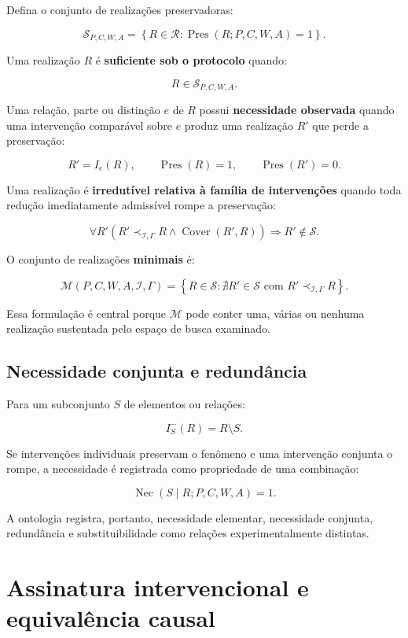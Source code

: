\documentclass[11pt,a4paper]{article}
\begin{document}
Defina o conjunto de realizações preservadoras:

\[
\mathcal S_{P,C,W,A}
=
\left\{
R\in\mathcal R:
\operatorname{Pres}(R;P,C,W,A)=1
\right\}.
\]

Uma realização $R$ é \textbf{suficiente sob o protocolo} quando:

\[
R\in\mathcal S_{P,C,W,A}.
\]

Uma relação, parte ou distinção $e$ de $R$ possui \textbf{necessidade observada}
quando uma intervenção comparável sobre $e$ produz uma realização $R'$ que perde a
preservação:

\[
R' = I_e(R),
\qquad
\operatorname{Pres}(R)=1,
\qquad
\operatorname{Pres}(R')=0.
\]

Uma realização é \textbf{irredutível relativa à família de intervenções} quando toda
redução imediatamente admissível rompe a preservação:

\[
\forall R'
\left(
R'\prec_{\mathcal I,\Gamma}R
\land
\operatorname{Cover}(R',R)
\right)
\Rightarrow
R'\notin\mathcal S.
\]

O conjunto de realizações \textbf{minimais} é:

\[
\boxed{
\mathcal M(P,C,W,A,\mathcal I,\Gamma)
=
\left\{
R\in\mathcal S:
\nexists R'\in\mathcal S
\text{ com }
R'\prec_{\mathcal I,\Gamma}R
\right\}.
}
\]

Essa formulação é central porque $\mathcal M$ pode conter uma, várias ou nenhuma
realização sustentada pelo espaço de busca examinado.

\subsection{Necessidade conjunta e redundância}

Para um subconjunto $S$ de elementos ou relações:

\[
I^{-}_{S}(R)=R\setminus S.
\]

Se intervenções individuais preservam o fenômeno e uma intervenção conjunta o rompe,
a necessidade é registrada como propriedade de uma combinação:

\[
\operatorname{Nec}(S\mid R;P,C,W,A)=1.
\]

A ontologia registra, portanto, necessidade elementar, necessidade conjunta,
redundância e substituibilidade como relações experimentalmente distintas.

\section{Assinatura intervencional e equivalência causal}
\end{document}
